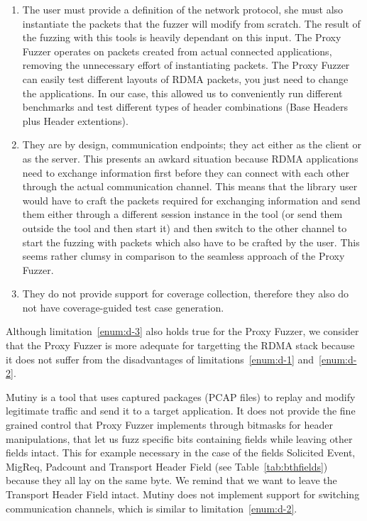 \begin{enumerate}
   \item The user must provide a definition of the network protocol, she must also instantiate the packets that the fuzzer will modify from scratch. The result of the fuzzing with this tools is heavily dependant on this input. The Proxy Fuzzer operates on packets created from actual connected applications, removing the unnecessary effort of instantiating packets. The Proxy Fuzzer can easily test different layouts of RDMA packets, you just need to change the applications. In our case, this allowed us to conveniently run different benchmarks and test different types of header combinations (Base Headers plus Header extentions).\label{enum:d-1}
   \item They are by design, communication endpoints; they act either as the client or as the server. This presents an awkard situation because RDMA applications need to exchange information first before they can connect with each other through the actual communication channel. This means that the library user would have to craft the packets required for exchanging information and send them either through a different session instance in the tool (or send them outside the tool and then start it)  and then switch to the other channel to start the fuzzing with packets which also have to be crafted by the user. This seems rather clumsy in comparison to the seamless approach of the Proxy Fuzzer.\label{enum:d-2}
   \item They do not provide support for coverage collection, therefore they also do not have coverage-guided test case generation.\label{enum:d-3}
\end{enumerate}

Although limitation~\ref{enum:d-3} also holds true for the Proxy Fuzzer, we consider that the Proxy Fuzzer is more adequate for
targetting the RDMA stack because it does not suffer from the disadvantages of limitations~\ref{enum:d-1} and~\ref{enum:d-2}.

Mutiny is a tool that uses captured packages (PCAP files) to replay and modify legitimate traffic and send it to a target application.
It does not provide the fine grained control that Proxy Fuzzer implements through bitmasks for header manipulations, that let us fuzz
specific bits containing fields while leaving other fields intact. This for example necessary in the case of the fields Solicited Event,
MigReq, Padcount and Transport Header Field (see Table~\ref{tab:bthfields}) because they all lay on the same byte. We remind that we want to
leave the Transport Header Field intact. Mutiny does
not implement support for switching communication channels, which is similar to limitation~\ref{enum:d-2}.

